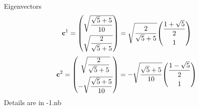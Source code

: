 \documentclass[a4paper]{article}
\numberwithin{equation}{subsection}
\newcommand{\code}[1]{\colorbox{codegray}{{\Consolas#1}}}
\begin{document}
Eigenvectors
\begin{equation}\label{key}
\vb{c}^1 
= \mqty(\sqrt{\dfrac{\sqrt{5}+5}{10}}\vspace{5pt}\\ \sqrt{\dfrac{2}{\sqrt{5}+5}}) 
= \sqrt{\dfrac{2}{\sqrt{5}+5}} 
\mqty(\dfrac{1+\sqrt{5}}{2} \vspace{5pt}\\1) 
\end{equation}
\begin{equation}\label{key}
\vb{c}^2
= \mqty(\sqrt{\dfrac{2}{\sqrt{5}+5}}\vspace{5pt}\\ -\sqrt{\dfrac{\sqrt{5}+5}{10}}) 
= -\sqrt{\dfrac{\sqrt{5}+5}{10}}
\mqty(\dfrac{1-\sqrt{5}}{2} \vspace{5pt}\\1) 
\end{equation}
Details are in \code{1-1.nb}
\end{document}
